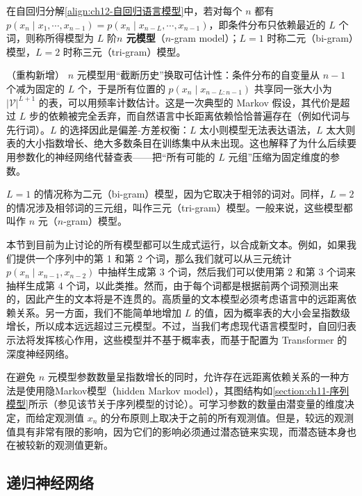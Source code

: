 \documentclass[../../main.tex]{subfiles}
\begin{document}
\begin{definition}[$n$ 元模型]\label{definition:ch12-n元模型}
在自回归分解\eqref{align:ch12-自回归语言模型}中，若对每个 $n$ 都有 $p(x_n\mid x_1,\cdots,x_{n-1})=p(x_n\mid x_{n-L},\cdots,x_{n-1})$，即条件分布只依赖最近的 $L$ 个词，则称所得模型为 $L$ 阶\textbf{$n$ 元模型}（$n$-gram model）；$L=1$ 时称二元（bi-gram）模型，$L=2$ 时称三元（tri-gram）模型。
\end{definition}

\begin{remark}（重构新增）
$n$ 元模型用“截断历史”换取可估计性：条件分布的自变量从 $n-1$ 个减为固定的 $L$ 个，于是所有位置的 $p(x_n\mid x_{n-L:n-1})$ 共享同一张大小为 $|\mathcal{V}|^{L+1}$ 的表，可以用频率计数估计。这是一次典型的 Markov 假设，其代价是超过 $L$ 步的依赖被完全丢弃，而自然语言中长距离依赖恰恰普遍存在（例如代词与先行词）。$L$ 的选择因此是偏差-方差权衡：$L$ 太小则模型无法表达语法，$L$ 太大则表的大小指数增长、绝大多数条目在训练集中从未出现。这也解释了为什么后续要用参数化的神经网络代替查表——把“所有可能的 $L$ 元组”压缩为固定维度的参数。
\end{remark}

$L=1$ 的情况称为二元（bi-gram）模型，因为它取决于相邻的词对。同样，$L=2$ 的情况涉及相邻词的三元组，叫作三元（tri-gram）模型。一般来说，这些模型都叫作 $n$ 元（$n$-gram）模型。

本节到目前为止讨论的所有模型都可以生成式运行，以合成新文本。例如，如果我们提供一个序列中的第 1 和第 2 个词，那么我们就可以从三元统计 $p(x_n\mid x_{n-1},x_{n-2})$ 中抽样生成第 3 个词，然后我们可以使用第 2 和第 3 个词来抽样生成第 4 个词，以此类推。然而，由于每个词都是根据前两个词预测出来的，因此产生的文本将是不连贯的。高质量的文本模型必须考虑语言中的远距离依赖关系。另一方面，我们不能简单地增加 $L$ 的值，因为概率表的大小会呈指数级增长，所以成本远远超过三元模型。不过，当我们考虑现代语言模型时，自回归表示法将发挥核心作用，这些模型并不基于概率表，而基于配置为 Transformer 的深度神经网络。

在避免 $n$ 元模型参数数量呈指数增长的同时，允许存在远距离依赖关系的一种方法是使用隐Markov模型（hidden Markov model），其图结构如\cref{section:ch11-序列模型}所示（参见该节关于序列模型的讨论）。可学习参数的数量由潜变量的维度决定，而给定观测值 $x_n$ 的分布原则上取决于之前的所有观测值。但是，较远的观测值具有非常有限的影响，因为它们的影响必须通过潜态链来实现，而潜态链本身也在被较新的观测值更新。

\subsection{递归神经网络}\label{subsection:ch12-递归神经网络}
\end{document}
